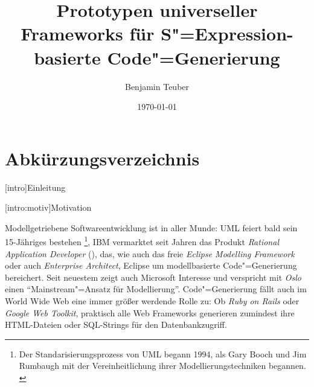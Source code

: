 \documentclass[a4paper, bibgerm]{book}
\newcommand\lchapter{}
\newcommand\lsection{}
\newcommand{\sexp}{S"=Expression}
\newcommand{\cgen}{Code"=Generierung}
\begin{document}
\begin{titlepage}
\title{Prototypen universeller Frameworks für
  \sexp{}-basierte \cgen{}}
\author{Benjamin Teuber}
\date{\today}

\maketitle
\end{titlepage}

\tableofcontents

\listoffigures

\chapter*{Abkürzungsverzeichnis}
\begin{acronym}
\end{acronym}


\lchapter[intro]{Einleitung}

\lsection[intro:motiv]{Motivation}

Modellgetriebene Softwareentwicklung ist in aller Munde: UML
feiert bald sein 15-Jähriges bestehen \footnote{Der
  Standarisierungsprozess von UML begann 1994, als Gary Booch und Jim
  Rumbaugh mit der Vereinheitlichung ihrer Modellierungstechniken
  begannen. \cite{TODO}}, IBM vermarktet seit Jahren das Produkt
\textit{Rational Application Developer} (\cite{TODO}), das, wie auch das freie
\textit{Eclipse Modelling Framework} oder auch \textit{Enterprise
  Architect}, Eclipse um modellbasierte \cgen{}
bereichert. Seit neuestem zeigt auch Microsoft Interesse und
verspricht mit \textit{Oslo} \cite{TODO} einen ``Mainstream"=Ansatz
für Modellierung''. \cgen{} fällt auch im World Wide Web eine
immer größer werdende Rolle zu: Ob \textit{Ruby on Rails} oder
\textit{Google Web Toolkit}, praktisch alle Web Frameworks generieren
zumindest ihre HTML-Dateien oder SQL-Strings für den Datenbankzugriff.
\end{document}
